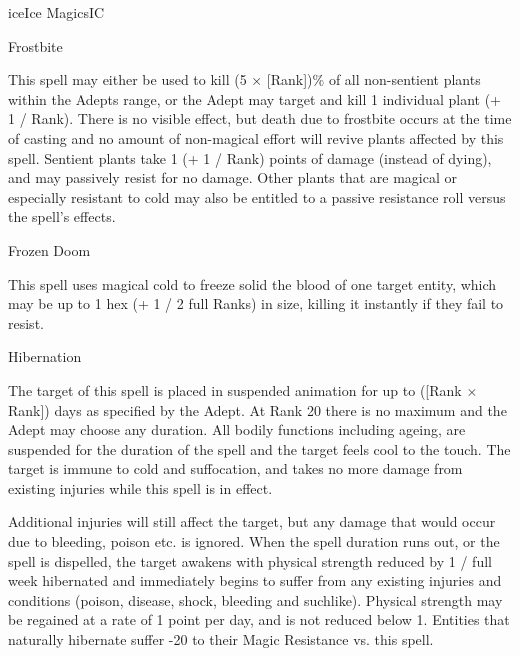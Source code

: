 \begin{College}[1.5]{ice}{Ice Magics}{IC}
\begin{spell}[S-4]{Frostbite}
\begin{effects}
 This spell may either be used to kill (5 × [Rank])\% of all
 non-sentient plants within the Adepts range, or the Adept may target
 and kill 1 individual plant (+ 1 / Rank).  There is no visible
 effect, but death due to frostbite occurs at the time of casting and
 no amount of non-magical effort will revive plants affected by this
 spell.  Sentient plants take 1 (+ 1 / Rank) points of damage (instead
 of dying), and may passively resist for no damage. Other plants that
 are magical or especially resistant to cold may also be entitled to a
 passive resistance roll versus the spell’s effects.
\end{effects}
\end{spell}

\begin{spell}[S-5]{Frozen Doom}
\begin{effects}
This spell uses magical cold to freeze solid the blood of one target
entity, which may be up to 1 hex (+ 1 / 2 full Ranks) in size, killing
it instantly if they fail to resist.
\end{effects}
\end{spell}

\begin{spell}[S-6]{Hibernation}
\begin{effects}
The target of this spell is placed in suspended animation for up to
([Rank × Rank]) days as specified by the Adept.  At Rank 20 there is
no maximum and the Adept may choose any duration.  All bodily
functions including ageing, are suspended for the duration of the
spell and the target feels cool to the touch.  The target is immune to
cold and suffocation, and takes no more damage from existing injuries
while this spell is in effect.

Additional injuries will still affect the target, but any damage that
would occur due to bleeding, poison etc. is ignored. When the spell
duration runs out, or the spell is dispelled, the target awakens with
physical strength reduced by 1 / full week hibernated and immediately
begins to suffer from any existing injuries and conditions (poison,
disease, shock, bleeding and suchlike).  Physical strength may be
regained at a rate of 1 point per day, and is not reduced below
1. Entities that naturally hibernate suffer -20 to their Magic
Resistance vs. this spell.
\end{effects}
\end{spell}


\end{College}
